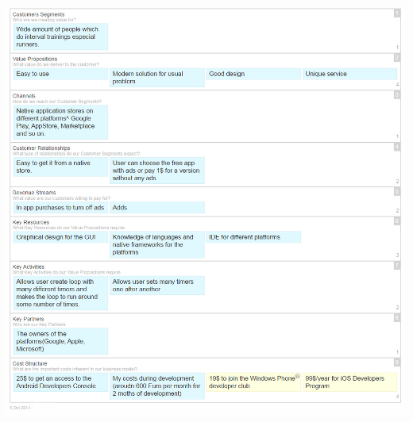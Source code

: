 \documentclass[english]{article}
\begin{document}
\includegraphics[scale=0.45]{BMC.jpg}

\end{document}
